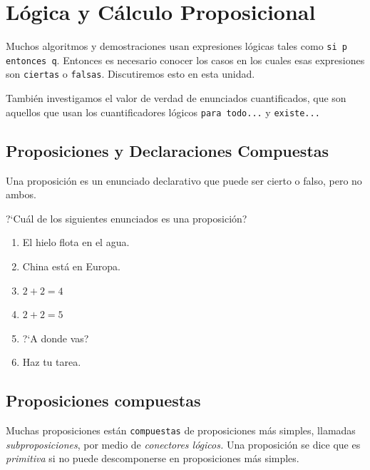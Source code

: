 \section{L\'ogica y C\'alculo Proposicional}


    Muchos algoritmos y demostraciones usan expresiones l\'ogicas tales como
    \texttt{si p entonces q}. Entonces es necesario conocer los casos en los cuales esas expresiones son \texttt{ciertas} o \texttt{falsas}. Discutiremos esto en esta unidad. 





    Tambi\'en investigamos el valor de verdad de enunciados cuantificados, que son aquellos que usan los cuantificadores l\'ogicos \texttt{para todo...} y \texttt{existe...}


\subsection{Proposiciones y Declaraciones Compuestas}


    Una proposici\'on es un enunciado declarativo que puede ser cierto o falso, pero no ambos. 



    \begin{exmp}
        ?`Cu\'al de los siguientes enunciados es una proposici\'on?
        \begin{multicols}{2}
            \begin{enumerate}
                \item El hielo flota en el agua.
                \item China est\'a en Europa.
                \item $2+2=4$
                \item $2+2=5$
                \item ?`A donde vas?
                \item Haz tu tarea.
            \end{enumerate}
        \end{multicols}
    \end{exmp}
    


\subsection{Proposiciones compuestas}


    Muchas proposiciones est\'an \texttt{compuestas} de proposiciones m\'as simples, llamadas \emph{subproposiciones}, por medio de \emph{conectores l\'ogicos.}  Una proposici\'on se dice que es \emph{primitiva} si no puede descomponerse en proposiciones m\'as simples.




